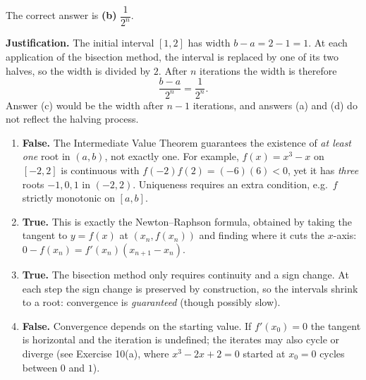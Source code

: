 \documentclass[11pt]{article}
\begin{document}
\begin{corrige}
The correct answer is \textbf{(b)} $\dfrac{1}{2^{n}}$.

\textbf{Justification.} The initial interval $[1,2]$ has width $b-a=2-1=1$. At each application of the bisection method, the interval is replaced by one of its two halves, so the width is divided by $2$. After $n$ iterations the width is therefore
\[
\frac{b-a}{2^{n}}=\frac{1}{2^{n}}.
\]
Answer (c) would be the width after $n-1$ iterations, and answers (a) and (d) do not reflect the halving process.
\end{corrige}

\begin{corrige}
\begin{enumerate}
\item \textbf{False.} The Intermediate Value Theorem guarantees the existence of \emph{at least one} root in $(a,b)$, not exactly one. For example, $f(x)=x^{3}-x$ on $[-2,2]$ is continuous with $f(-2)f(2)=(-6)(6)<0$, yet it has \emph{three} roots $-1,0,1$ in $(-2,2)$. Uniqueness requires an extra condition, e.g.\ $f$ strictly monotonic on $[a,b]$.
\item \textbf{True.} This is exactly the Newton--Raphson formula, obtained by taking the tangent to $y=f(x)$ at $(x_{n},f(x_{n}))$ and finding where it cuts the $x$-axis: $0-f(x_{n})=f'(x_{n})(x_{n+1}-x_{n})$.
\item \textbf{True.} The bisection method only requires continuity and a sign change. At each step the sign change is preserved by construction, so the intervals shrink to a root: convergence is \emph{guaranteed} (though possibly slow).
\item \textbf{False.} Convergence depends on the starting value. If $f'(x_{0})=0$ the tangent is horizontal and the iteration is undefined; the iterates may also cycle or diverge (see Exercise 10(a), where $x^{3}-2x+2=0$ started at $x_{0}=0$ cycles between $0$ and $1$).
\end{enumerate}
\end{corrige}
\end{document}
